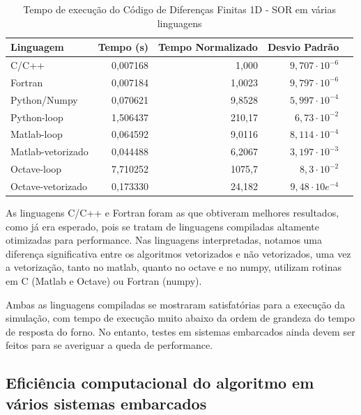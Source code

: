 \begin{table}[htbp]
    \caption{Tempo de execução do Código de Diferenças Finitas 1D - SOR em várias linguagens}
    \label{tab:tempo_sor}
    \vspace{1em}
    \centering
    \begin{tabular}{l r r r r}
        \toprule
        Linguagem	        & Tempo (s)     & Tempo Normalizado & Desvio Padrão	    \\
        \midrule
        C/C++   	        & 0,007168		& 1,000	            & $9,707 \cdot 10^{-6}$	\\
        Fortran	            & 0,007184      & 1,0023            & $9,797 \cdot 10^{-6}$ \\
        Python/Numpy   	    & 0,070621		& 9,8528		    & $5,997 \cdot 10^{-4}$	\\
        Python-loop   	    & 1,506437		& 210,17		    & $6,73 \cdot 10^{-2}$		    \\
        Matlab-loop   	    & 0,064592		& 9,0116		    & $8,114 \cdot 10^{-4}$	\\
        Matlab-vetorizado   & 0,044488	    & 6,2067		    & $3,197 \cdot 10^{-3}$  \\
        Octave-loop   	    & 7,710252	    & 1075,7		    & $8,3 \cdot 10^{-2}$		    \\
        Octave-vetorizado   & 0,173330		& 24,182		    & $9,48 \cdot 10e^{-4}$ \\
        \bottomrule
    \end{tabular}
\end{table}

As linguagens C/C++ e Fortran foram as que obtiveram melhores resultados, como já era esperado, pois se tratam de linguagens compiladas altamente otimizadas para performance. Nas linguagens interpretadas, notamos uma diferença significativa entre os algoritmos vetorizados e não vetorizados, uma vez a vetorização, tanto no matlab, quanto no octave e no numpy, utilizam rotinas em C (Matlab e Octave) ou Fortran (numpy).

Ambas as linguagens compiladas se mostraram satisfatórias para a execução da simulação, com tempo de execução muito abaixo da ordem de grandeza do tempo de resposta do forno. No entanto, testes em sistemas embarcados ainda devem ser feitos para se averiguar a queda de performance.

\subsection{Eficiência computacional do algoritmo em vários sistemas embarcados}

